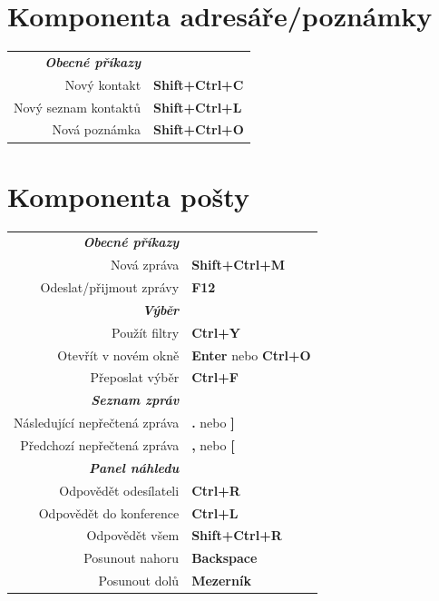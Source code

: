 \documentclass[12pt]{article}
\begin{document}
\begin{landscape}
\begin{center}
\begin{multicols}{2}
	\section*{Komponenta adresáře/poznámky}
	\begin{tabular*}{4in}{rp{1.5in}}
		\textit{\textbf{Obecné příkazy}}	&					\\
		Nový kontakt				& \textbf{Shift+Ctrl+C}			\\
		Nový seznam kontaktů			& \textbf{Shift+Ctrl+L}			\\
		Nová poznámka				& \textbf{Shift+Ctrl+O}			\\
	\end{tabular*}
	\section*{Komponenta pošty}
	\begin{tabular*}{4in}{rp{1.5in}}
		\textit{\textbf{Obecné příkazy}}	&					\\
		Nová zpráva				& \textbf{Shift+Ctrl+M}			\\
		\vspace{1.5mm}
		Odeslat/přijmout zprávy			& \textbf{F12}				\\
		\textit{\textbf{Výběr}}			&					\\
		Použít filtry				& \textbf{Ctrl+Y}			\\
		Otevřít v novém okně 			& \textbf{Enter} nebo \textbf{Ctrl+O}	\\
		\vspace{1.5mm}
		Přeposlat výběr				& \textbf{Ctrl+F}			\\
		\textit{\textbf{Seznam zpráv}}		&					\\
		Následující nepřečtená zpráva		& \textbf{.} nebo \textbf{]}		\\
		\vspace{1.5mm}
		Předchozí nepřečtená zpráva		& \textbf{,} nebo \textbf{[}		\\
		\textit{\textbf{Panel náhledu}}		&					\\
		Odpovědět odesílateli			& \textbf{Ctrl+R}			\\
		Odpovědět do konference			& \textbf{Ctrl+L}			\\
		Odpovědět všem		 		& \textbf{Shift+Ctrl+R}			\\
		Posunout nahoru				& \textbf{Backspace}			\\
		Posunout dolů				& \textbf{Mezerník}			\\
	\end{tabular*}

\end{multicols}
\end{center}
\end{landscape}
\end{document}
